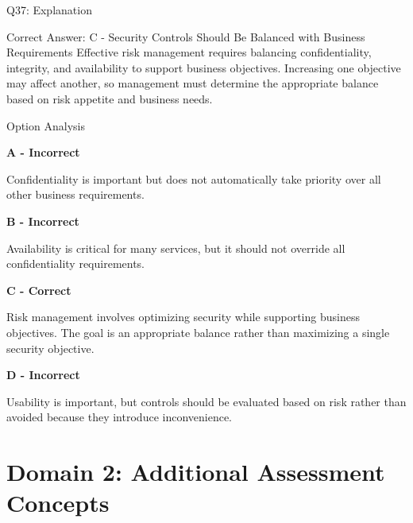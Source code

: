 \documentclass{beamer}
\begin{document}
	\begin{frame}[shrink=10]{Q37: Explanation}
		\footnotesize
		
		\begin{block}{Correct Answer: C - Security Controls Should Be Balanced with Business Requirements}
			Effective risk management requires balancing confidentiality,
			integrity, and availability to support business objectives.
			Increasing one objective may affect another, so management must
			determine the appropriate balance based on risk appetite and
			business needs.
		\end{block}
		
		\begin{block}{Option Analysis}
			
			\textbf{A - Incorrect}
			
			Confidentiality is important but does not automatically take
			priority over all other business requirements.
			
			\vspace{0.15cm}
			
			\textbf{B - Incorrect}
			
			Availability is critical for many services, but it should not
			override all confidentiality requirements.
			
			\vspace{0.15cm}
			
			\textbf{C - Correct}
			
			Risk management involves optimizing security while supporting
			business objectives. The goal is an appropriate balance rather
			than maximizing a single security objective.
			
			\vspace{0.15cm}
			
			\textbf{D - Incorrect}
			
			Usability is important, but controls should be evaluated based
			on risk rather than avoided because they introduce inconvenience.
			
		\end{block}
		

		
	\end{frame}
	
	
	\section{Domain 2: Additional Assessment Concepts}
	
\end{document}
